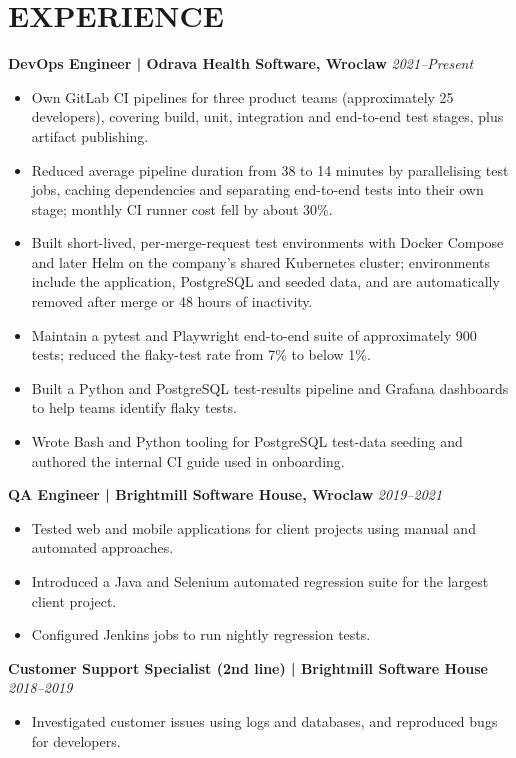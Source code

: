 \documentclass[11pt,a4paper]{article}
\begin{document}
\section*{EXPERIENCE}
\textbf{DevOps Engineer | Odrava Health Software, Wroclaw} \hfill \textit{2021--Present}
\begin{itemize}
\item Own GitLab CI pipelines for three product teams (approximately 25 developers), covering build, unit, integration and end-to-end test stages, plus artifact publishing.
\item Reduced average pipeline duration from 38 to 14 minutes by parallelising test jobs, caching dependencies and separating end-to-end tests into their own stage; monthly CI runner cost fell by about 30\%.
\item Built short-lived, per-merge-request test environments with Docker Compose and later Helm on the company’s shared Kubernetes cluster; environments include the application, PostgreSQL and seeded data, and are automatically removed after merge or 48 hours of inactivity.
\item Maintain a pytest and Playwright end-to-end suite of approximately 900 tests; reduced the flaky-test rate from 7\% to below 1\%.
\item Built a Python and PostgreSQL test-results pipeline and Grafana dashboards to help teams identify flaky tests.
\item Wrote Bash and Python tooling for PostgreSQL test-data seeding and authored the internal CI guide used in onboarding.
\end{itemize}

\textbf{QA Engineer | Brightmill Software House, Wroclaw} \hfill \textit{2019--2021}
\begin{itemize}
\item Tested web and mobile applications for client projects using manual and automated approaches.
\item Introduced a Java and Selenium automated regression suite for the largest client project.
\item Configured Jenkins jobs to run nightly regression tests.
\end{itemize}

\textbf{Customer Support Specialist (2nd line) | Brightmill Software House} \hfill \textit{2018--2019}
\begin{itemize}
\item Investigated customer issues using logs and databases, and reproduced bugs for developers.
\end{itemize}
\end{document}
